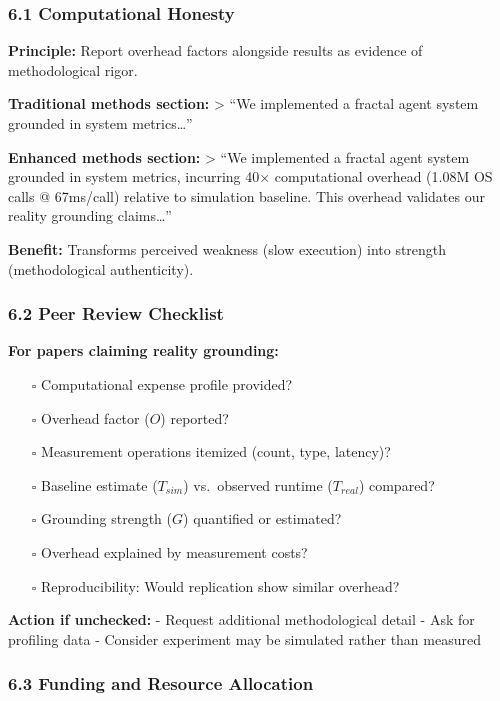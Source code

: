 \documentclass[
]{article}
\providecommand{\tightlist}{%
  \setlength{\itemsep}{0pt}\setlength{\parskip}{0pt}}
\begin{document}
\subsubsection{6.1 Computational Honesty}\label{computational-honesty}

\textbf{Principle:} Report overhead factors alongside results as
evidence of methodological rigor.

\textbf{Traditional methods section:} \textgreater{} ``We implemented a
fractal agent system grounded in system metrics\ldots{}''

\textbf{Enhanced methods section:} \textgreater{} ``We implemented a
fractal agent system grounded in system metrics, incurring 40×
computational overhead (1.08M OS calls @ 67ms/call) relative to
simulation baseline. This overhead validates our reality grounding
claims\ldots{}''

\textbf{Benefit:} Transforms perceived weakness (slow execution) into
strength (methodological authenticity).

\subsubsection{6.2 Peer Review Checklist}\label{peer-review-checklist}

\textbf{For papers claiming reality grounding:}

\begin{itemize}
\tightlist
\item[$\square$]
  Computational expense profile provided?
\item[$\square$]
  Overhead factor (\(O\)) reported?
\item[$\square$]
  Measurement operations itemized (count, type, latency)?
\item[$\square$]
  Baseline estimate (\(T_{sim}\)) vs.~observed runtime (\(T_{real}\))
  compared?
\item[$\square$]
  Grounding strength (\(G\)) quantified or estimated?
\item[$\square$]
  Overhead explained by measurement costs?
\item[$\square$]
  Reproducibility: Would replication show similar overhead?
\end{itemize}

\textbf{Action if unchecked:} - Request additional methodological detail
- Ask for profiling data - Consider experiment may be simulated rather
than measured

\subsubsection{6.3 Funding and Resource
Allocation}\label{funding-and-resource-allocation}
\end{document}
